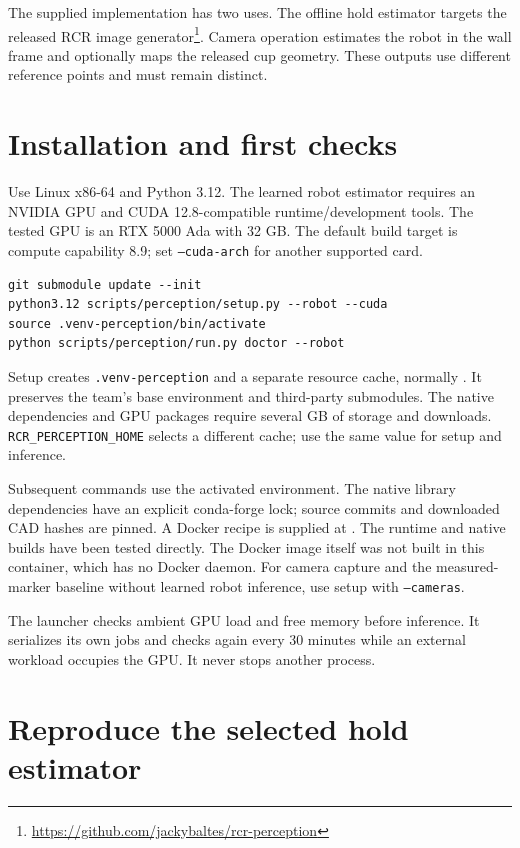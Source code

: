 \documentclass[11pt,a4paper]{article}
\begin{document}
The supplied implementation has two uses. The offline hold estimator targets
the released RCR image generator\footnote{\url{https://github.com/jackybaltes/rcr-perception}}. Camera operation estimates the robot in the
wall frame and optionally maps the released cup geometry. These outputs use
different reference points and must remain distinct.

\section{Installation and first checks}
Use Linux x86-64 and Python 3.12. The learned robot estimator requires an NVIDIA
GPU and CUDA 12.8-compatible runtime/development tools. The tested GPU is an
RTX 5000 Ada with 32 GB. The default build target is compute capability 8.9; set
\texttt{--cuda-arch} for another supported card.
\begin{verbatim}
git submodule update --init
python3.12 scripts/perception/setup.py --robot --cuda
source .venv-perception/bin/activate
python scripts/perception/run.py doctor --robot
\end{verbatim}
Setup creates \texttt{.venv-perception} and a separate resource cache, normally
. It preserves the team's base environment and
third-party submodules. The native dependencies and GPU packages require
several GB of storage and downloads. \texttt{RCR\_PERCEPTION\_HOME} selects a
different cache; use the same value for setup and inference.

Subsequent commands use the activated environment.
The native library dependencies have an explicit conda-forge lock; source
commits and downloaded CAD hashes are pinned. A Docker recipe is supplied at
. The runtime and native builds have been
tested directly. The Docker image itself was not built in this container,
which has no Docker daemon. For camera capture and the measured-marker
baseline without learned robot inference, use setup with \texttt{--cameras}.

The launcher checks ambient GPU load and free memory before inference. It
serializes its own jobs and checks again every 30 minutes while an external
workload occupies the GPU. It never stops another process.

\section{Reproduce the selected hold estimator}
\end{document}
